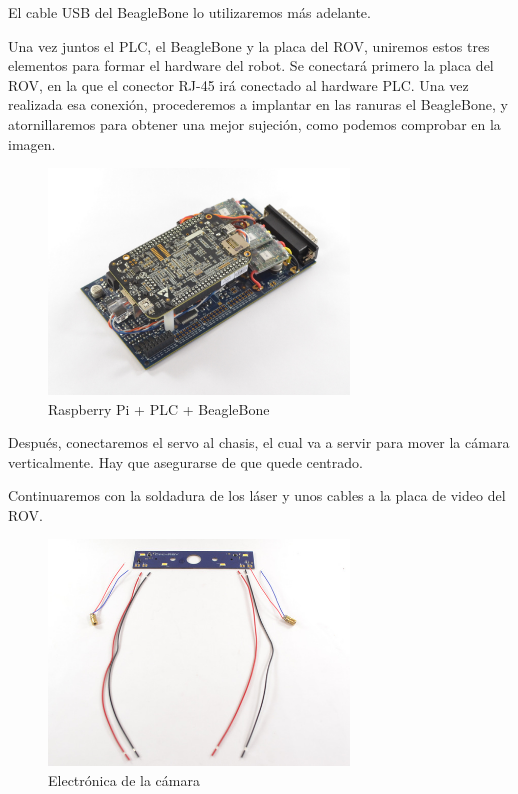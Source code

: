 El cable USB del BeagleBone lo utilizaremos más adelante.

Una vez juntos el PLC, el BeagleBone y la placa del ROV, uniremos estos tres elementos para formar el hardware del robot. Se conectará primero la placa del ROV, en la que el conector RJ-45 irá conectado al hardware PLC. Una vez realizada esa conexión, procederemos a implantar en las ranuras el BeagleBone, y atornillaremos para obtener una mejor sujeción, como podemos comprobar en la imagen.

\begin{figure} [hbtp]
  \begin{center}
    \includegraphics[width=8cm]{img/cap3/3_3/electronica}
  \end{center}
  \caption{Raspberry Pi + PLC + BeagleBone}
  \label{fig:electronica}
\end{figure}

Después, conectaremos el servo al chasis, el cual va a servir para mover la cámara verticalmente. Hay que asegurarse de que quede centrado.

Continuaremos con la soldadura de los láser y unos cables a la placa de video del ROV.

\begin{figure} [hbtp]
  \begin{center}
    \includegraphics[width=8cm]{img/cap3/3_3/electronica_camara}
  \end{center}
  \caption{Electrónica de la cámara}
  \label{fig:electronica_camara}
\end{figure}

